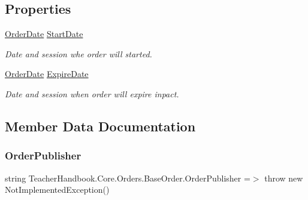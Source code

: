 \subsection*{Properties}
\begin{DoxyCompactItemize}
\item 
\mbox{\hyperlink{struct_teacher_handbook_1_1_core_1_1_orders_1_1_order_date}{Order\+Date}} \mbox{\hyperlink{class_teacher_handbook_1_1_core_1_1_orders_1_1_base_order_a01ff46c6c7c2def5204de29b67f646c9}{Start\+Date}}
\begin{DoxyCompactList}\small\item\em Date and session whe order will started. \end{DoxyCompactList}\item 
\mbox{\hyperlink{struct_teacher_handbook_1_1_core_1_1_orders_1_1_order_date}{Order\+Date}} \mbox{\hyperlink{class_teacher_handbook_1_1_core_1_1_orders_1_1_base_order_a4b671ac999b946ff76f2a689bd456463}{Expire\+Date}}
\begin{DoxyCompactList}\small\item\em Date and session when order will expire inpact. \end{DoxyCompactList}\end{DoxyCompactItemize}


\subsection{Member Data Documentation}
\mbox{\label{class_teacher_handbook_1_1_core_1_1_orders_1_1_base_order_a59ec952bde8892fe9c48d34c838be374}} 
\subsubsection{\texorpdfstring{Order\+Publisher}{OrderPublisher}}
{\footnotesize\ttfamily string Teacher\+Handbook.\+Core.\+Orders.\+Base\+Order.\+Order\+Publisher =$>$ throw new Not\+Implemented\+Exception()}



